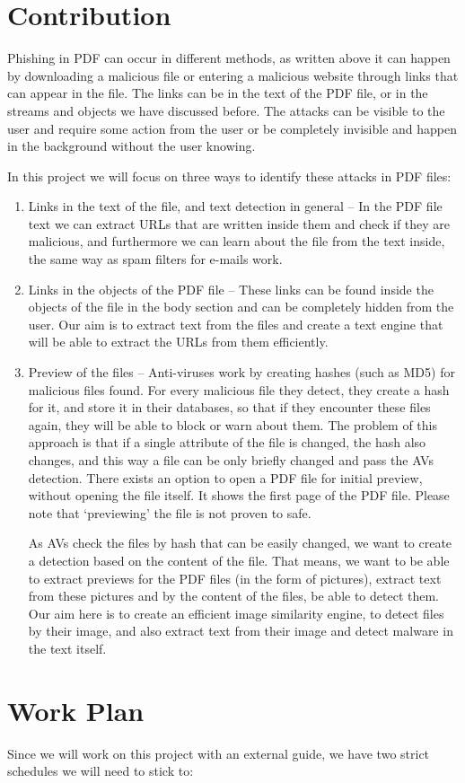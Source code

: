 \documentclass{article}
\begin{document}
\section{Contribution}
\indent Phishing in PDF can occur in different methods, as written above it can happen by downloading a malicious file or entering a malicious website through links that can appear in the file. The links can be in the text of the PDF file, or in the streams and objects we have discussed before. The attacks can be visible to the user and require some action from the user or be completely invisible and happen in the background without the user knowing. 

\indent In this project we will focus on three ways to identify these attacks in PDF files:

\begin{enumerate}
	\item Links in the text of the file, and text detection in general – In the PDF file text we can extract URLs that are written inside them and check if they are malicious, and furthermore we can learn about the file from the text inside, the same way as spam filters for e-mails work.
	\item Links in the objects of the PDF file – These links can be found inside the objects of the file in the body section and can be completely hidden from the user. Our aim is to extract text from the files and create a text engine that will be able to extract the URLs from them efficiently.
	\item Preview of the files – Anti-viruses work by creating hashes (such as MD5) for malicious files found. For every malicious file they detect, they create a hash for it, and store it in their databases, so that if they encounter these files again, they will be able to block or warn about them. The problem of this approach is that if a single attribute of the file is changed, the hash also changes, and this way a file can be only briefly changed and pass the AVs detection. There exists an option to open a PDF file for initial preview, without opening the file itself. It shows the first page of the PDF file. Please note that ‘previewing’ the file is not proven to safe.
	 
As AVs check the files by hash that can be easily changed, we want to create a detection based on the content of the file. That means, we want to be able to extract previews for the PDF files (in the form of pictures), extract text from these pictures and by the content of the files, be able to detect them. Our aim here is to create an efficient image similarity engine, to detect files by their image, and also extract text from their image and detect malware in the text itself.

\end{enumerate}

\section{Work Plan}
\indent Since we will work on this project with an external guide, we have two strict schedules we will need to stick to:



\end{document}
